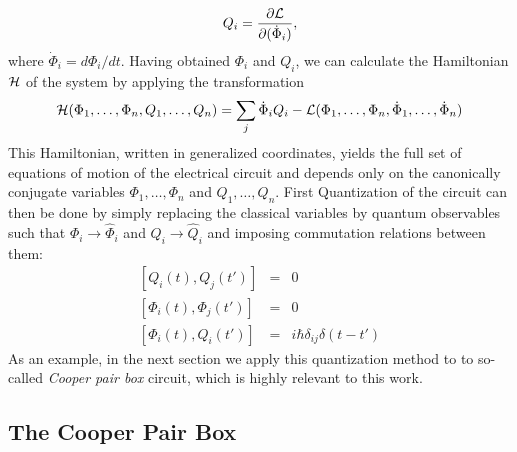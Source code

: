 %
\begin{equation}
Q_i = \frac{\partial \begin{mathcal}L\end{mathcal}}{\partial(\dot{\Phi}_i)}, \label{eq:canonical_momentum}
\end{equation}
%
where $\dot{\Phi}_i=d\Phi_i/dt$. Having obtained $\Phi_i$ and $Q_i$, we can calculate the Hamiltonian $\begin{mathcal}H\end{mathcal}$ of the system by applying the transformation
%
\begin{equation}
\begin{mathcal}H\end{mathcal}(\Phi_1,\hdots,\Phi_n,Q_1,\hdots,Q_n) = \sum\limits_j \dot{\Phi}_i Q_i - \begin{mathcal}L\end{mathcal}(\Phi_1,\hdots,\Phi_n,\dot{\Phi}_1,\hdots,\dot{\Phi}_n) \label{eq:l_to_h}
\end{equation}
%
This Hamiltonian, written in generalized coordinates, yields the full set of equations of motion of the electrical circuit and depends only on the canonically conjugate variables $\Phi_{1},\hdots,\Phi_n$ and $Q_1,\hdots,Q_n$. First Quantization of the circuit can then be done by simply replacing the classical variables by quantum observables such that $\Phi_i\to\hat{\Phi}_i$ and $Q_i\to\hat{Q}_i$ and imposing commutation relations between them:
%
\begin{eqnarray}
\left[Q_i(t),Q_j(t')\right] & = & 0 \\
\left[\Phi_i(t),\Phi_j(t') \right] & = & 0 \\
\left[\Phi_i(t),Q_i(t')\right] & = & i\hbar\delta_{ij}\delta(t-t') \label{eq:quantization_commutation_relations}
\end{eqnarray}
%
As an example, in the next section we apply this quantization method to to so-called {\it Cooper pair box} circuit, which is highly relevant to this work.

\subsection{The Cooper Pair Box}

